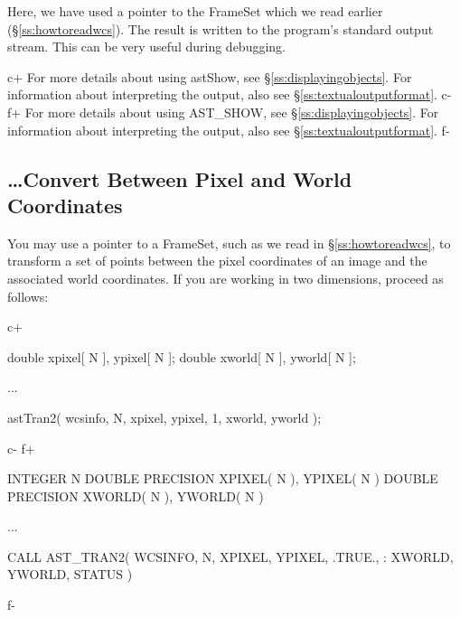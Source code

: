 \documentclass[twoside,11pt]{starlink}
\providecommand{\secref}[1]{\S\ref{#1}}
\begin{document}
Here, we have used a pointer to the FrameSet which we read earlier
(\secref{ss:howtoreadwcs}).  The result is written to the program's
standard output stream. This can be very useful during debugging.

c+
For more details about using astShow, see
\secref{ss:displayingobjects}. For information about interpreting the
output, also see \secref{ss:textualoutputformat}.
c-
f+
For more details about using AST\_SHOW, see
\secref{ss:displayingobjects}. For information about interpreting the
output, also see \secref{ss:textualoutputformat}.
f-

\subsection{\label{ss:howtotransform}\ldots Convert Between Pixel and World Coordinates}

You may use a pointer to a FrameSet, such as we read in
\secref{ss:howtoreadwcs}, to transform a set of points between the
pixel coordinates of an image and the associated world coordinates. If
you are working in two dimensions, proceed as follows:

c+
\begin{small}
\begin{terminalv}
double xpixel[ N ], ypixel[ N ];
double xworld[ N ], yworld[ N ];

...

astTran2( wcsinfo, N, xpixel, ypixel, 1, xworld, yworld );
\end{terminalv}
\end{small}
c-
f+
\small
\begin{terminalv}
      INTEGER N
      DOUBLE PRECISION XPIXEL( N ), YPIXEL( N )
      DOUBLE PRECISION XWORLD( N ), YWORLD( N )

      ...

      CALL AST_TRAN2( WCSINFO, N, XPIXEL, YPIXEL, .TRUE.,
     :                            XWORLD, YWORLD, STATUS )
\end{terminalv}
\normalsize
f-
\end{document}

